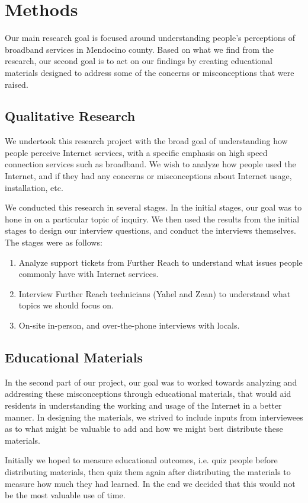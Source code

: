 \section{Methods}
\label{sec:methods}

Our main research goal is focused around understanding people's perceptions of
broadband services in Mendocino county. Based on what we find from the research,
our second goal is to act on our findings by creating educational materials
designed to address some of the concerns or misconceptions that were raised.

\subsection{Qualitative Research}

We undertook this research project with the broad goal of understanding how
people perceive Internet services, with a specific emphasis on high speed
connection services such as broadband. We wish to analyze how people used
the Internet, and if they had any concerns or misconceptions about Internet
usage, installation, etc.

We conducted this research in several stages. In the initial stages, our goal
was to hone in on a particular topic of inquiry. We then used the results from the
initial stages to design our interview questions, and conduct the interviews
themselves. The stages were as follows:

\begin{enumerate}
\item Analyze support tickets from Further Reach to understand what issues
people commonly have with Internet services.
\item Interview Further Reach technicians (Yahel and Zean) to understand what
topics we should focus on.
\item On-site in-person, and over-the-phone interviews with locals.
\end{enumerate}

\subsection{Educational Materials}

In the second part of our project, our goal was to worked towards analyzing
and addressing these misconceptions through educational materials, that would
aid residents in understanding the working and usage of the Internet in a
better manner. In designing the materials, we strived to include inputs from
interviewees as to what might be valuable to add and how we might best
distribute these materials.

Initially we hoped to measure educational outcomes, i.e. quiz people before
distributing materials, then quiz them again after distributing the materials
to measure how much they had learned. In the end we decided that this would
not be the most valuable use of time.


